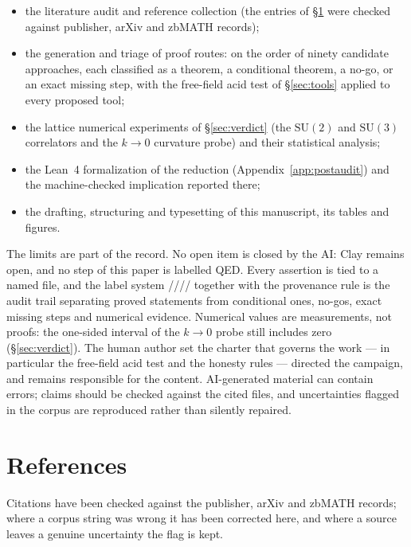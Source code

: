 \begin{itemize}
\item the literature audit and reference collection (the entries of \S\ref{sec:refs} were
  checked against publisher, arXiv and zbMATH records);
\item the generation and triage of proof routes: on the order of ninety candidate approaches,
  each classified as a theorem, a conditional theorem, a no-go, or an exact missing step, with
  the free-field acid test of \S\ref{sec:tools} applied to every proposed tool;
\item the lattice numerical experiments of \S\ref{sec:verdict} (the $\mathrm{SU}(2)$ and
  $\mathrm{SU}(3)$ correlators and the $k\to0$ curvature probe) and their statistical analysis;
\item the Lean~4 formalization of the reduction (Appendix~\ref{app:postaudit}) and the
  machine-checked implication reported there;
\item the drafting, structuring and typesetting of this manuscript, its tables and figures.
\end{itemize}

The limits are part of the record. No open item is closed by the AI: Clay remains open, and no
step of this paper is labelled QED. Every assertion is tied to a named file, and the label
system \LT/\LC/\LN/\LM/\LE{} together with the provenance rule is the audit trail separating
proved statements from conditional ones, no-gos, exact missing steps and numerical evidence.
Numerical values are measurements, not proofs: the one-sided interval of the $k\to0$ probe
still includes zero (\S\ref{sec:verdict}). The human author set the charter that governs the
work --- in particular the free-field acid test and the honesty rules --- directed the campaign,
and remains responsible for the content. AI-generated material can contain errors; claims
should be checked against the cited files, and uncertainties flagged in the corpus are
reproduced rather than silently repaired.

\section{References}
\label{sec:refs}

Citations have been checked against the publisher, arXiv and zbMATH records; where a corpus
string was wrong it has been corrected here, and where a source leaves a genuine uncertainty the
flag is kept.

